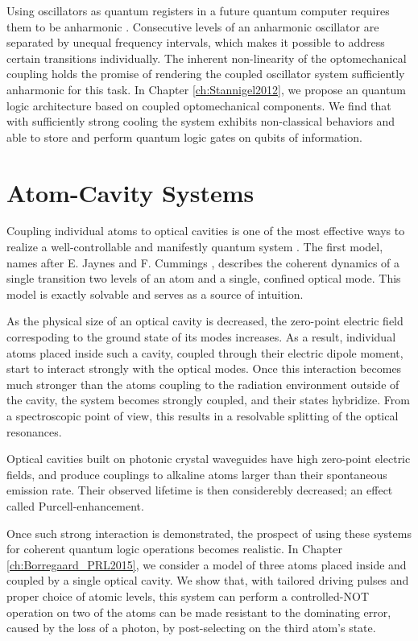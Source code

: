 Using oscillators as quantum registers in a future quantum computer requires
them to be anharmonic \cite{Majer2007}. Consecutive levels of an
anharmonic oscillator are separated by unequal frequency intervals, which makes
it possible to address certain transitions individually. The inherent
non-linearity of the optomechanical coupling holds the promise of rendering the
coupled oscillator system sufficiently anharmonic for this task. In Chapter
\ref{ch:Stannigel2012}, we propose an quantum logic architecture based on
coupled optomechanical components. We find that with sufficiently strong cooling
the system exhibits non-classical behaviors and able to store and perform
quantum logic gates on qubits of information.






\section{Atom-Cavity Systems}
Coupling individual atoms to optical cavities is one of the most effective ways
to realize a well-controllable and manifestly quantum system \cite{Mabuchi2002,
Walther2006}.
The first model, names after E. Jaynes and F. Cummings \cite{Jaynes1963,
Shore1993}, describes the coherent dynamics of a single transition two levels of
an atom and a single, confined optical mode. This model is exactly solvable and
serves as a source of intuition.

As the physical size of an optical cavity is decreased, the zero-point
electric field correspoding to the ground state of its modes increases.
As a result, individual atoms placed inside such a cavity, coupled through their
electric dipole moment, start to interact strongly with the optical modes. Once
this interaction becomes much stronger than the atoms coupling to the radiation
environment outside of the cavity, the system becomes strongly coupled, and
their states hybridize. From a spectroscopic point of view, this results in a
resolvable splitting of the optical resonances.

Optical cavities built on photonic crystal waveguides \cite{Tiecke} have
high zero-point electric fields, and produce couplings
to alkaline atoms larger than their spontaneous emission rate. Their
observed lifetime is then considerebly decreased; an effect called
Purcell-enhancement.

Once such strong interaction is demonstrated, the prospect of using these
systems for coherent quantum logic operations becomes realistic. In Chapter
\ref{ch:Borregaard_PRL2015}, we consider a model of three atoms placed inside
and coupled by a single optical cavity. We show that, with tailored driving pulses
and proper choice of atomic levels, this system can perform a controlled-NOT
operation on two of the atoms can be made resistant to the dominating error,
caused by the loss of a photon, by post-selecting on the third atom's
state.

